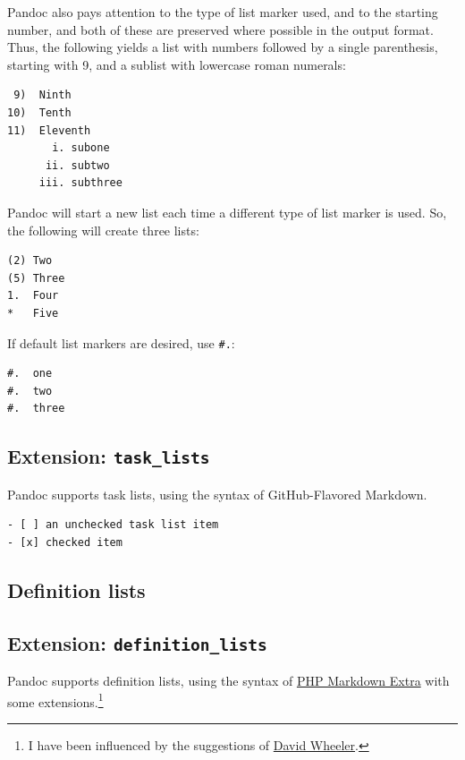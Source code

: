 \documentclass[
  b5paper
]{book}
\begin{document}
Pandoc also pays attention to the type of list marker used, and to the
starting number, and both of these are preserved where possible in the
output format. Thus, the following yields a list with numbers followed
by a single parenthesis, starting with 9, and a sublist with lowercase
roman numerals:

\begin{verbatim}
 9)  Ninth
10)  Tenth
11)  Eleventh
       i. subone
      ii. subtwo
     iii. subthree
\end{verbatim}

Pandoc will start a new list each time a different type of list marker
is used. So, the following will create three lists:

\begin{verbatim}
(2) Two
(5) Three
1.  Four
*   Five
\end{verbatim}

If default list markers are desired, use \texttt{\#.}:

\begin{verbatim}
#.  one
#.  two
#.  three
\end{verbatim}

\subsection{\texorpdfstring{Extension:
\texttt{task\_lists}}{Extension: task\_lists}}\label{extension-task_lists}

Pandoc supports task lists, using the syntax of GitHub-Flavored
Markdown.

\begin{verbatim}
- [ ] an unchecked task list item
- [x] checked item
\end{verbatim}

\subsection{Definition lists}\label{definition-lists}

\subsection{\texorpdfstring{Extension:
\texttt{definition\_lists}}{Extension: definition\_lists}}\label{extension-definition_lists}

Pandoc supports definition lists, using the syntax of
\href{https://michelf.ca/projects/php-markdown/extra/}{PHP Markdown
Extra} with some extensions.\footnote{I have been influenced by the
  suggestions of
  \href{https://justatheory.com/2009/02/modest-markdown-proposal/}{David
  Wheeler}.}
\end{document}
